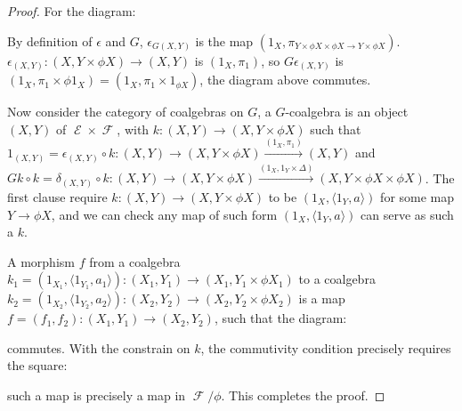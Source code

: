 \documentclass[a4paper]{article}
\DeclareMathOperator{\E}{\mathcal E}
\DeclareMathOperator{\F}{\mathcal F}
\begin{document}
\begin{proof}
    For the diagram:

    \begin{center}
    \end{center}

    By definition of $\epsilon$ and $G$, $\epsilon_{G(X,Y)}$ is the map $(1_X,\pi_{Y\times \phi X\times \phi X\to Y\times \phi X})$. $\epsilon_{(X,Y)}:(X, Y\times \phi X)\to (X,Y)$ is $(1_X,\pi_1)$, so $G\epsilon_{(X,Y)}$ is $(1_X,\pi_1\times \phi 1_X)=(1_X,\pi_1\times 1_{\phi X})$, the diagram above commutes.

    Now consider the category of coalgebras on $G$, a $G$-coalgebra is an object $(X,Y)$ of $\E\times \F$, with $k:(X,Y)\to (X,Y\times \phi X)$ such that $1_{(X,Y)}=\epsilon_{(X,Y)}\circ k:(X,Y)\to (X,Y\times \phi X)\overset{(1_X,\pi_1)}\to (X,Y)$ and $Gk\circ k=\delta_{(X,Y)}\circ k:(X,Y)\to (X,Y\times \phi X)\overset{(1_X,1_Y\times \Delta)}\to  (X,Y\times \phi X\times \phi X)$. The first clause require $k:(X,Y)\to (X,Y\times \phi X)$ to be $(1_X,\langle 1_Y, a\rangle)$ for  some map $Y\to \phi X$, and we can check any map of such form $(1_X,\langle 1_Y, a\rangle)$ can serve as such a $k$.

    A morphism $f$ from a coalgebra $k_1=(1_{X_1},\langle 1_{Y_1},a_1\rangle):(X_1,Y_1)\to (X_1,Y_1\times \phi X_1)$  to a coalgebra $k_2=(1_{X_2},\langle 1_{Y_2},a_2\rangle ):(X_2,Y_2)\to (X_2,Y_2\times \phi X_2)$ is a map $f=(f_1,f_2):(X_1,Y_1)\to (X_2,Y_2)$, such that the diagram:
    \begin{center}
    \end{center}

    commutes. With the constrain on $k$, the commutivity condition precisely requires the square:

    \begin{center}
    \end{center}

    such a map is precisely a map in $\F/\phi$. This completes the proof.
\end{proof}
\end{document}
